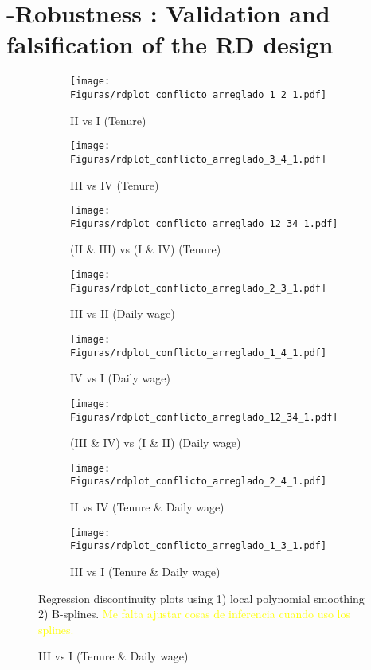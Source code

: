 \newpage



\section{ -Robustness : Validation and falsification of the RD design}
\vspace{.2in}


\begin{figure}[H]
     \caption{RD plots (Control)}
    \label{rd_control}
\begin{center}
\begin{subfigure}{0.31\textwidth}
\caption{II vs I (Tenure)}
        \texttt{[image: Figuras/rdplot\_conflicto\_arreglado\_1\_2\_1.pdf]}
    \end{subfigure}
    \begin{subfigure}{0.31\textwidth}
\caption{III vs IV (Tenure)}
        \texttt{[image: Figuras/rdplot\_conflicto\_arreglado\_3\_4\_1.pdf]}
    \end{subfigure}
\begin{subfigure}{0.31\textwidth}
\caption{(II \& III) vs (I \& IV)	(Tenure)}
        \texttt{[image: Figuras/rdplot\_conflicto\_arreglado\_12\_34\_1.pdf]}
    \end{subfigure}
    \begin{subfigure}{0.31\textwidth}
\caption{III vs II (Daily wage)}
        \texttt{[image: Figuras/rdplot\_conflicto\_arreglado\_2\_3\_1.pdf]}
    \end{subfigure}        
    \begin{subfigure}{0.31\textwidth}
\caption{IV vs I (Daily wage)}
        \texttt{[image: Figuras/rdplot\_conflicto\_arreglado\_1\_4\_1.pdf]}
    \end{subfigure}    
    \begin{subfigure}{0.31\textwidth}
\caption{(III \& IV) vs (I \& II) (Daily wage)}
        \texttt{[image: Figuras/rdplot\_conflicto\_arreglado\_12\_34\_1.pdf]}
    \end{subfigure}       
\begin{subfigure}{0.31\textwidth}
\caption{II vs IV (Tenure \& Daily wage)}
        \texttt{[image: Figuras/rdplot\_conflicto\_arreglado\_2\_4\_1.pdf]}
    \end{subfigure}
    \begin{subfigure}{0.31\textwidth}
\caption{III vs I (Tenure \& Daily wage)}
        \texttt{[image: Figuras/rdplot\_conflicto\_arreglado\_1\_3\_1.pdf]}
    \end{subfigure}        
  \end{center}
  
    \scriptsize Regression discontinuity plots using 1) local polynomial smoothing 2) B-splines. \textcolor{yellow}{Me falta ajustar cosas de inferencia cuando uso los splines.}
\end{figure}




